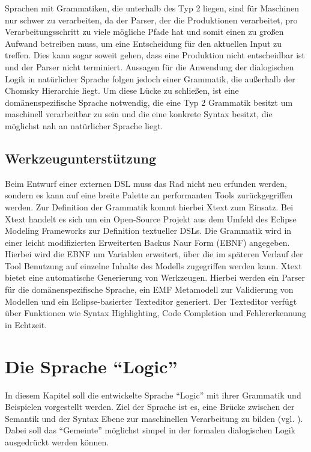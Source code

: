 \documentclass[11pt,a4paper,bibtotocnumbered]{scrreprt}
\begin{document}
Sprachen mit Grammatiken, die unterhalb des Typ 2 liegen, sind für Maschinen nur schwer zu verarbeiten, da der Parser, der die Produktionen verarbeitet, pro Verarbeitungsschritt zu viele mögliche Pfade hat und somit einen zu großen Aufwand betreiben muss, um eine Entscheidung für den aktuellen Input zu treffen. Dies kann sogar soweit gehen, dass eine Produktion nicht entscheidbar ist und der Parser nicht terminiert.
Aussagen für die Anwendung der dialogischen Logik in natürlicher Sprache folgen jedoch einer Grammatik, die außerhalb der Chomsky Hierarchie liegt. Um diese Lücke zu schließen, ist eine domänenspezifische Sprache notwendig, die eine Typ 2 Grammatik besitzt um maschinell verarbeitbar zu sein und die eine konkrete Syntax besitzt, die möglichst nah an natürlicher Sprache liegt.

\section{Werkzeugunterstützung}
Beim Entwurf einer externen DSL muss das Rad nicht neu erfunden werden, sondern es kann auf eine breite Palette an performanten Tools zurückgegriffen werden. Zur Definition der Grammatik kommt hierbei Xtext \cite{Xtext} zum Einsatz. Bei Xtext handelt es sich um ein Open-Source Projekt aus dem Umfeld des Eclipse Modeling Frameworks zur Definition textueller DSLs.
Die Grammatik wird in einer leicht modifizierten Erweiterten Backus Naur Form (EBNF) angegeben. Hierbei wird die EBNF um Variablen erweitert, über die im späteren Verlauf der Tool Benutzung auf einzelne Inhalte des Modells zugegriffen werden kann. Xtext bietet eine automatische Generierung von Werkzeugen. Hierbei werden ein Parser für die domänenspezifische Sprache, ein EMF Metamodell zur Validierung von Modellen und ein Eclipse-basierter Texteditor generiert. Der Texteditor verfügt über Funktionen wie Syntax Highlighting, Code Completion und Fehlererkennung in Echtzeit.

\chapter{Die Sprache \enquote{Logic}} %

In diesem Kapitel soll die entwickelte Sprache \enquote{Logic} mit ihrer Grammatik und Beispielen vorgestellt werden.
Ziel der Sprache ist es, eine Brücke zwischen der Semantik und der Syntax Ebene zur maschinellen Verarbeitung zu bilden (vgl. \cite[Folie 11]{OrtnerDL}).
Dabei soll das \enquote{Gemeinte} möglichst simpel in der formalen dialogischen Logik ausgedrückt werden können.
\end{document}
